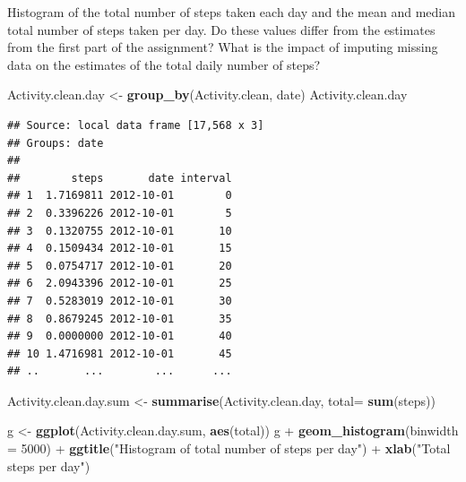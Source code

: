 \documentclass[]{article}
\newenvironment{Shaded}{\begin{snugshade}}{\end{snugshade}}
\newcommand{\KeywordTok}[1]{\textcolor[rgb]{0.13,0.29,0.53}{\textbf{{#1}}}}
\newcommand{\DataTypeTok}[1]{\textcolor[rgb]{0.13,0.29,0.53}{{#1}}}
\newcommand{\DecValTok}[1]{\textcolor[rgb]{0.00,0.00,0.81}{{#1}}}
\newcommand{\StringTok}[1]{\textcolor[rgb]{0.31,0.60,0.02}{{#1}}}
\newcommand{\NormalTok}[1]{{#1}}
\begin{document}
\begin{Shaded}
\end{Shaded}

Histogram of the total number of steps taken each day and the mean and
median total number of steps taken per day. Do these values differ from
the estimates from the first part of the assignment? What is the impact
of imputing missing data on the estimates of the total daily number of
steps?

\begin{Shaded}
\begin{Highlighting}[]
\NormalTok{Activity.clean.day <-}\StringTok{ }\KeywordTok{group_by}\NormalTok{(Activity.clean, date) }
\NormalTok{Activity.clean.day}
\end{Highlighting}
\end{Shaded}

\begin{verbatim}
## Source: local data frame [17,568 x 3]
## Groups: date
## 
##        steps       date interval
## 1  1.7169811 2012-10-01        0
## 2  0.3396226 2012-10-01        5
## 3  0.1320755 2012-10-01       10
## 4  0.1509434 2012-10-01       15
## 5  0.0754717 2012-10-01       20
## 6  2.0943396 2012-10-01       25
## 7  0.5283019 2012-10-01       30
## 8  0.8679245 2012-10-01       35
## 9  0.0000000 2012-10-01       40
## 10 1.4716981 2012-10-01       45
## ..       ...        ...      ...
\end{verbatim}

\begin{Shaded}
\begin{Highlighting}[]
\NormalTok{Activity.clean.day.sum <-}\StringTok{ }\KeywordTok{summarise}\NormalTok{(Activity.clean.day, }\DataTypeTok{total=} \KeywordTok{sum}\NormalTok{(steps))}


\NormalTok{g <-}\StringTok{ }\KeywordTok{ggplot}\NormalTok{(Activity.clean.day.sum, }\KeywordTok{aes}\NormalTok{(total))}
\NormalTok{g +}\StringTok{ }\KeywordTok{geom_histogram}\NormalTok{(}\DataTypeTok{binwidth =} \DecValTok{5000}\NormalTok{) +}\StringTok{ }\KeywordTok{ggtitle}\NormalTok{(}\StringTok{"Histogram of total number of steps per day"}\NormalTok{) +}\StringTok{ }\KeywordTok{xlab}\NormalTok{(}\StringTok{"Total steps per day"}\NormalTok{)}
\end{Highlighting}
\end{Shaded}
\end{document}
